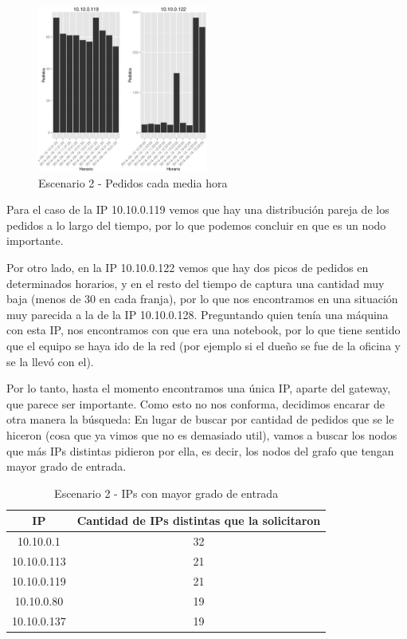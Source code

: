     \begin{figure}[!htb]
		\centering
		\includegraphics[width=0.5\textwidth]{img/graph/escenario_2/requestsCadaMediaHora119y122.eps}
		\caption{Escenario 2 - Pedidos cada media hora}
		\label{fig:escenario2_requestsCadaMediaHora119y122}
	\end{figure}
    \par Para el caso de la IP 10.10.0.119 vemos que hay una distribución pareja de los pedidos a lo largo del tiempo, por lo que podemos concluir en que es un nodo importante. 
    \par Por otro lado, en la IP 10.10.0.122 vemos que hay dos picos de pedidos en determinados horarios, y en el resto del tiempo de captura una cantidad muy baja (menos de 30 en cada franja), por lo que nos encontramos en una situación muy parecida a la de la IP 10.10.0.128. Preguntando quien tenía una máquina con esta IP, nos encontramos con que era una notebook, por lo que tiene sentido que el equipo se haya ido de la red (por ejemplo si el dueño se fue de la oficina y se la llevó con el).
    \par Por lo tanto, hasta el momento encontramos una única IP, aparte del gateway, que parece ser importante. Como esto no nos conforma, decidimos encarar de otra manera la búsqueda: En lugar de buscar por cantidad de pedidos que se le hiceron (cosa que ya vimos que no es demasiado util), vamos a buscar los nodos que más IPs distintas pidieron por ella, es decir, los nodos del grafo que tengan mayor grado de entrada.    
    \begin{table}[!htb]
		\caption{Escenario 2 - IPs con mayor grado de entrada}
		\centering
		\begin{tabular}{c c}
          IP & Cantidad de IPs distintas que la solicitaron \\
          \hline 
          10.10.0.1 & 32 \\ 
          10.10.0.113 & 21 \\
          10.10.0.119 & 21 \\
          10.10.0.80 & 19 \\
          10.10.0.137 & 19 \\   
  		\end{tabular}
  	\end{table}
